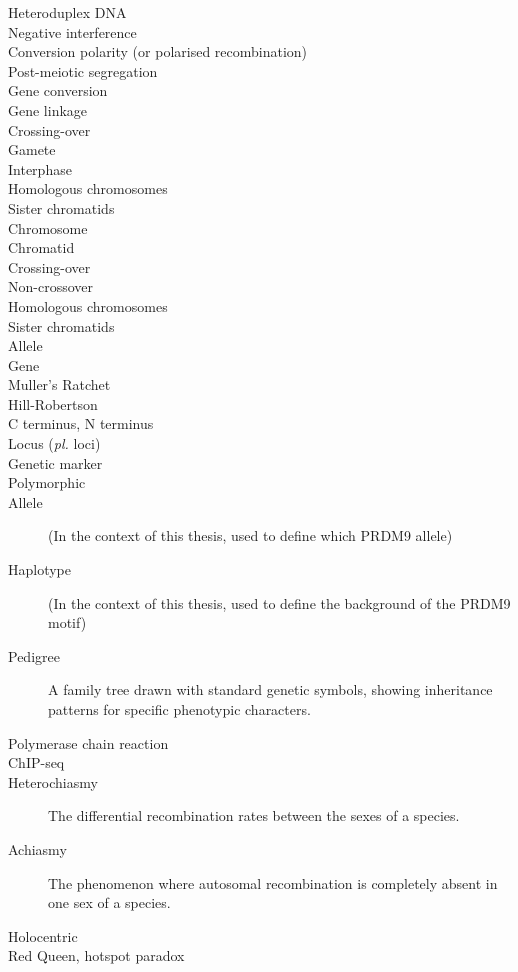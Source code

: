 \begin{alwayssingle}
\begin{description}
		\item[Heteroduplex DNA]
		\item[Negative interference]
		\item[Conversion polarity (or polarised recombination)]
		\item[Post-meiotic segregation]
		\item[Gene conversion]
		\item[Gene linkage]
		\item[Crossing-over]
		\item[Gamete]
		\item[Interphase]
		\item[Homologous chromosomes]
		\item[Sister chromatids]
		\item[Chromosome]
		\item[Chromatid]
		\item[Crossing-over]
		\item[Non-crossover]
		\item[Homologous chromosomes]
		\item[Sister chromatids]
		\item[Allele]
		\item[Gene]
		\item[Muller's Ratchet]
		\item[Hill-Robertson]
		\item[C terminus, N terminus]
		\item[Locus (\textit{pl.} loci)]
		\item[Genetic marker]
		\item[Polymorphic]
		\item[Allele] (In the context of this thesis, used to define which PRDM9 allele)
		\item[Haplotype] (In the context of this thesis, used to define the background of the PRDM9 motif)
		\item[Pedigree] A family tree drawn with standard genetic symbols, showing inheritance patterns for specific phenotypic characters.
		\item[Polymerase chain reaction]
		\item[ChIP-seq]
		\item[Heterochiasmy] The differential recombination rates between the sexes of a species.
		\item[Achiasmy] The phenomenon where autosomal recombination is completely absent in one sex of a species.
		\item[Holocentric]
		\item[Red Queen, hotspot paradox]

\end{description}
\end{alwayssingle}
